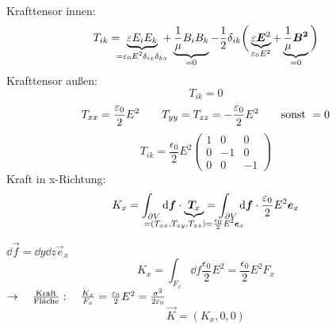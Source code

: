 \begin{minipage}{.4\linewidth}
	\flushright
\end{minipage}%
\\
Krafttensor innen:
\begin{equation*}
T_{ik} = \ \ub{\epsilon E_i E_k}_{\mathclap{= \epsilon_0 E^2 \delta_{ix} \delta_{kx}}} \ + \ub{\frac{1}{\mu} B_i B_k}_{=0} - \frac{1}{2} \delta_{ik} \bigg(\ub{\epsilon \vec{E}^2}_{\epsilon_0 E^2} + \ub{\frac{1}{\mu} \vec{B^2}}_{= 0}\bigg)
\end{equation*}
Krafttensor außen:
\begin{equation*}
T_{ik} = 0
\end{equation*}
\vspace{5pt}
\begin{equation*}
T_{xx} = \frac{\varepsilon_0}{2} E^2 \qquad T_{yy} = T_{zz} = - \frac{\varepsilon_0}{2} E^2 \qquad \textrm{sonst } = 0
\end{equation*}
\begin{equation*}
T_{ik} = \frac{\epsilon_0}{2} E^2 \begin{pmatrix}
1 & 0 & 0\\
0 & -1 & 0\\
0 & 0 & -1
\end{pmatrix}
\end{equation*}
Kraft in x-Richtung:
\begin{equation*}
K_x = \int_{\partial V} \dd\vec{f} \cdot \ub{\vec{T}_x}_{\mathclap{= (T_{xx},T_{xy},T_{xz}) = \frac{\epsilon_0}{2} E^2 \vec{e}_x}} = \int_{\partial V} \dd \vec{f} \cdot \frac{\epsilon_0}{2} E^2 \vec{e}_x
\end{equation*}
\begin{minipage}{.6\linewidth}
	$ \dd \vec{f} = \dd y \dd z \vec{e}_x $
	\begin{equation*}
	K_x = \int_{F_x} \dd f \frac{\epsilon_0}{2} E^2 = \frac{\epsilon_0}{2} E^2 F_x
	\end{equation*}
	$\rightarrow \quad \frac{\textrm{Kraft}}{\textrm{Fläche}} : \quad \frac{K_x}{F_x} = \frac{\varepsilon_0}{2} E^2 = \frac{\sigma^2}{2 \varepsilon_0}$
	\begin{equation*}
	\vec{K} = (K_x,0,0)
	\end{equation*}
\end{minipage}%

